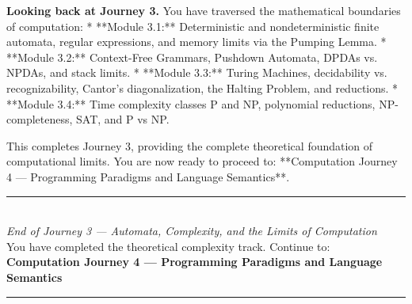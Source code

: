 \documentclass[12pt, a4paper]{book}
\begin{document}
\medskip
\noindent\textbf{Looking back at Journey 3.}
You have traversed the mathematical boundaries of computation:
* **Module 3.1:** Deterministic and nondeterministic finite automata, regular expressions, and memory limits via the Pumping Lemma.
* **Module 3.2:** Context-Free Grammars, Pushdown Automata, DPDAs vs. NPDAs, and stack limits.
* **Module 3.3:** Turing Machines, decidability vs. recognizability, Cantor's diagonalization, the Halting Problem, and reductions.
* **Module 3.4:** Time complexity classes P and NP, polynomial reductions, NP-completeness, SAT, and P vs NP.

This completes Journey 3, providing the complete theoretical foundation of computational limits. You are now ready to proceed to: **Computation Journey 4 --- Programming Paradigms and Language Semantics**.

\vspace{1.4cm}
\begin{center}
{\color{JourneyColor}\rule{0.5\linewidth}{0.8pt}}\\[6pt]
{\small\color{JourneyColor}\textit{End of Journey 3 --- Automata, Complexity, and the Limits of Computation}}\\[4pt]
{\small\color{JourneyColor}You have completed the theoretical complexity track. Continue to: \textbf{Computation Journey 4 --- Programming Paradigms and Language Semantics}}\\[6pt]
{\color{JourneyColor}\rule{0.5\linewidth}{0.8pt}}
\end{center}
\end{document}
